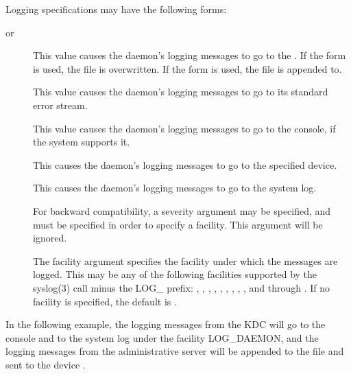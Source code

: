 \documentclass[letterpaper,10pt,english]{sphinxmanual}
\begin{document}
Logging specifications may have the following forms:
\begin{description}
\item[{ or }] \leavevmode
This value causes the daemon’s logging messages to go to the
.  If the \sphinxcode{=} form is used, the file is overwritten.
If the \sphinxcode{:} form is used, the file is appended to.

\item[{}] \leavevmode
This value causes the daemon’s logging messages to go to its
standard error stream.

\item[{}] \leavevmode
This value causes the daemon’s logging messages to go to the
console, if the system supports it.

\item[{}] \leavevmode
This causes the daemon’s logging messages to go to the specified
device.

\item[{\sphinxstylestrong{SYSLOG}{[}\sphinxstylestrong{:}\sphinxstyleemphasis{severity}{[}\sphinxstylestrong{:}\sphinxstyleemphasis{facility}{]}{]}}] \leavevmode
This causes the daemon’s logging messages to go to the system log.

For backward compatibility, a severity argument may be specified,
and must be specified in order to specify a facility.  This
argument will be ignored.

The facility argument specifies the facility under which the
messages are logged.  This may be any of the following facilities
supported by the syslog(3) call minus the LOG\_ prefix: ,
, , , , , ,
, , and  through .  If no
facility is specified, the default is .

\end{description}

In the following example, the logging messages from the KDC will go to
the console and to the system log under the facility LOG\_DAEMON, and
the logging messages from the administrative server will be appended
to the file  and sent to the device
.
\end{document}
